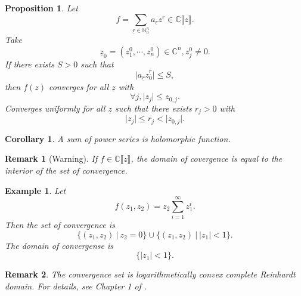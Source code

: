 \documentclass{article}
\newtheorem{proposition}{Proposition}[section]
\newtheorem{remark}{Remark}[section]
\newtheorem{corollary}{Corollary} [section]
\newtheorem{example}{Example}[section]
\newcommand{\N}[0]{\mathbb{N}}
\newcommand{\C}[0]{\mathbb{C}}
\newcommand{\sep}[0]{\:|\:}
\begin{document}
\begin{proposition}
  Let 
  \begin{equation*}
    f = \sum_{\underline{r}\in\N_0^n}a_{\underline{r}}z^{\underline{r}}\in\C\llbracket z\rrbracket.
  \end{equation*}
  Take
  \begin{equation*}
  \underline{z}_0 = (z_{1}^0,\cdots ,z_{n}^0)\in\C^n, z_j^0\not=0.
  \end{equation*}
If there exists $S>0$ such that 
  \begin{equation*}
    \vert a_{\underline{r}}z_0^{\underline{r}}\vert\leq S,
  \end{equation*}
  then $f(z)$ converges for all $\underline{z}$ with 
  \begin{equation*}
    \forall j, \vert z_j\vert \leq z_{0,j}.
  \end{equation*}
  Converges uniformly for all $\underline{z}$ such that there exists $r_j>0$ with
  \begin{equation*}
    \vert z_j\vert \leq r_j<\vert z_{0,j}\vert.
  \end{equation*}
\end{proposition}
\begin{corollary}
  A sum of power series is holomorphic function.
\end{corollary}

\begin{remark}[Warning]
  If $f\in\C\llbracket z\rrbracket$, the domain of covergence is equal to the interior of the set of convergence. 
\end{remark}

\begin{example}
  Let
  \begin{equation*}
    f(z_1,z_2) = z_2\sum_{i=1}^\infty z_1^i.
  \end{equation*}
  Then the set of convergence is 
  \begin{equation*}
    \{(z_1,z_2)\sep z_2=0\}\cup\{(z_1,z_2)\sep \vert z_1\vert <1\}.
  \end{equation*}
  The domain of convergense is 
  \begin{equation*}
    \{\vert z_1\vert < 1\}.
  \end{equation*}
\end{example}

\begin{remark}
  The convergence set is logarithmetically convex complete Reinhardt domain. For details, see Chapter 1 of \cite{Gr-Fr}.
\end{remark}
\end{document}
